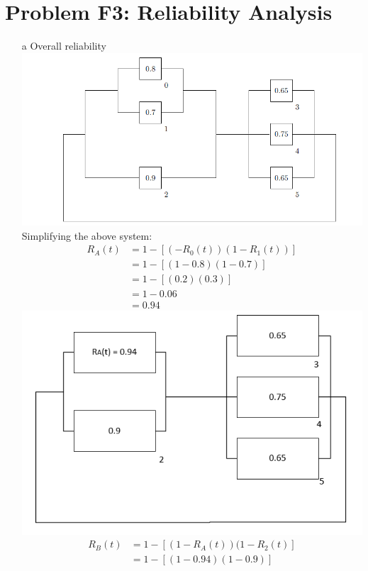 \documentclass[]{article}
\begin{document}
	\section{Problem F3: Reliability Analysis}
	\begin{itemize}
		\item [a] Overall reliability\\
		\includegraphics[scale=0.5]{F3}\\
		Simplifying the above system:\\
		\begin{align*}
			R_{A}(t)&=1-[(-R_0(t))(1-R_1(t))]\\
			&=1-[(1-0.8)(1-0.7)]\\
			&=1-[(0.2)(0.3)]\\
			&=1-0.06\\
			&=0.94
		\end{align*}
		\includegraphics[scale=0.5]{Ra}\centering
		\begin{align*}
			R_{B}(t)&=1-[(1-R_{A}(t))(1-R_{2}(t)]\\
			&=1-[(1-0.94)(1-0.9)]\\

\end{align*}
\end{itemize}
\end{document}
